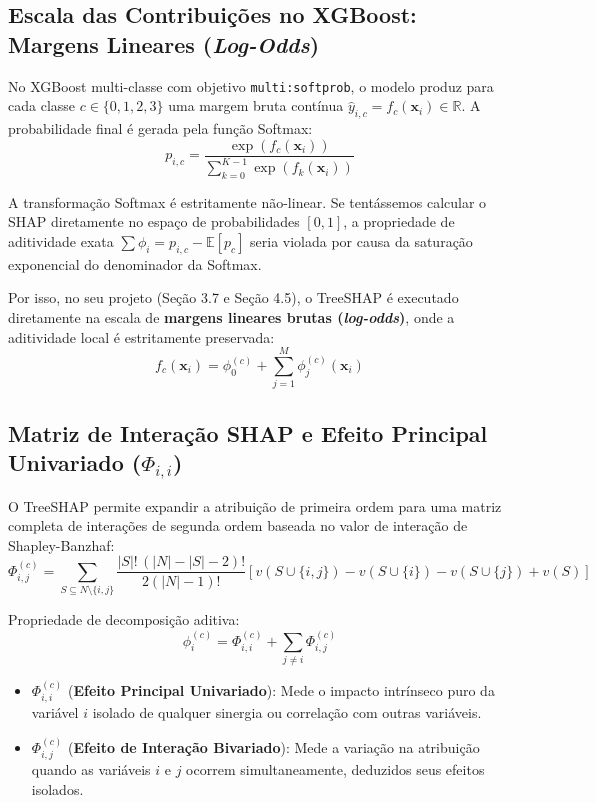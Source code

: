 \documentclass[11pt,a4paper]{article}
\begin{document}
\subsection{Escala das Contribuições no XGBoost: Margens Lineares (\textit{Log-Odds})}

No XGBoost multi-classe com objetivo \texttt{multi:softprob}, o modelo produz para cada classe $c \in \{0, 1, 2, 3\}$ uma margem bruta contínua $\hat{y}_{i, c} = f_c(\mathbf{x}_i) \in \mathbb{R}$. A probabilidade final é gerada pela função Softmax:
$$p_{i, c} = \frac{\exp(f_c(\mathbf{x}_i))}{\sum_{k=0}^{K-1} \exp(f_k(\mathbf{x}_i))}$$

\begin{warningcard}
A transformação Softmax é estritamente não-linear. Se tentássemos calcular o SHAP diretamente no espaço de probabilidades $[0, 1]$, a propriedade de aditividade exata $\sum \phi_i = p_{i, c} - \mathbb{E}[p_c]$ seria violada por causa da saturação exponencial do denominador da Softmax.

Por isso, no seu projeto (Seção 3.7 e Seção 4.5), o TreeSHAP é executado diretamente na escala de \textbf{margens lineares brutas (\textit{log-odds})}, onde a aditividade local é estritamente preservada:
$$f_c(\mathbf{x}_i) = \phi_0^{(c)} + \sum_{j=1}^M \phi_j^{(c)}(\mathbf{x}_i)$$
\end{warningcard}

\subsection{Matriz de Interação SHAP e Efeito Principal Univariado ($\Phi_{i, i}$)}

O TreeSHAP permite expandir a atribuição de primeira ordem para uma matriz completa de interações de segunda ordem baseada no valor de interação de Shapley-Banzhaf:
$$\Phi_{i, j}^{(c)} = \sum_{S \subseteq N \setminus \{i, j\}} \frac{|S|! \, (|N| - |S| - 2)!}{2(|N| - 1)!} \left[ v(S \cup \{i, j\}) - v(S \cup \{i\}) - v(S \cup \{j\}) + v(S) \right]$$

Propriedade de decomposição aditiva:
$$\phi_i^{(c)} = \Phi_{i, i}^{(c)} + \sum_{j \neq i} \Phi_{i, j}^{(c)}$$

\begin{itemize}[leftmargin=*]
  \item $\Phi_{i, i}^{(c)}$ (\textbf{Efeito Principal Univariado}): Mede o impacto intrínseco puro da variável $i$ isolado de qualquer sinergia ou correlação com outras variáveis.
  \item $\Phi_{i, j}^{(c)}$ (\textbf{Efeito de Interação Bivariado}): Mede a variação na atribuição quando as variáveis $i$ e $j$ ocorrem simultaneamente, deduzidos seus efeitos isolados.
\end{itemize}
\end{document}
